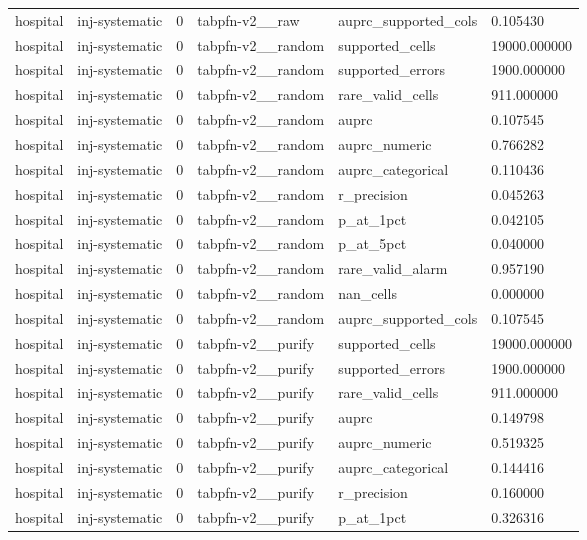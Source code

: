 \begin{tabular}{llllll}
hospital & inj-systematic & 0 & tabpfn-v2\_\_raw & auprc\_supported\_cols & 0.105430 \\
hospital & inj-systematic & 0 & tabpfn-v2\_\_random & supported\_cells & 19000.000000 \\
hospital & inj-systematic & 0 & tabpfn-v2\_\_random & supported\_errors & 1900.000000 \\
hospital & inj-systematic & 0 & tabpfn-v2\_\_random & rare\_valid\_cells & 911.000000 \\
hospital & inj-systematic & 0 & tabpfn-v2\_\_random & auprc & 0.107545 \\
hospital & inj-systematic & 0 & tabpfn-v2\_\_random & auprc\_numeric & 0.766282 \\
hospital & inj-systematic & 0 & tabpfn-v2\_\_random & auprc\_categorical & 0.110436 \\
hospital & inj-systematic & 0 & tabpfn-v2\_\_random & r\_precision & 0.045263 \\
hospital & inj-systematic & 0 & tabpfn-v2\_\_random & p\_at\_1pct & 0.042105 \\
hospital & inj-systematic & 0 & tabpfn-v2\_\_random & p\_at\_5pct & 0.040000 \\
hospital & inj-systematic & 0 & tabpfn-v2\_\_random & rare\_valid\_alarm & 0.957190 \\
hospital & inj-systematic & 0 & tabpfn-v2\_\_random & nan\_cells & 0.000000 \\
hospital & inj-systematic & 0 & tabpfn-v2\_\_random & auprc\_supported\_cols & 0.107545 \\
hospital & inj-systematic & 0 & tabpfn-v2\_\_purify & supported\_cells & 19000.000000 \\
hospital & inj-systematic & 0 & tabpfn-v2\_\_purify & supported\_errors & 1900.000000 \\
hospital & inj-systematic & 0 & tabpfn-v2\_\_purify & rare\_valid\_cells & 911.000000 \\
hospital & inj-systematic & 0 & tabpfn-v2\_\_purify & auprc & 0.149798 \\
hospital & inj-systematic & 0 & tabpfn-v2\_\_purify & auprc\_numeric & 0.519325 \\
hospital & inj-systematic & 0 & tabpfn-v2\_\_purify & auprc\_categorical & 0.144416 \\
hospital & inj-systematic & 0 & tabpfn-v2\_\_purify & r\_precision & 0.160000 \\
hospital & inj-systematic & 0 & tabpfn-v2\_\_purify & p\_at\_1pct & 0.326316 \\

\end{tabular}
